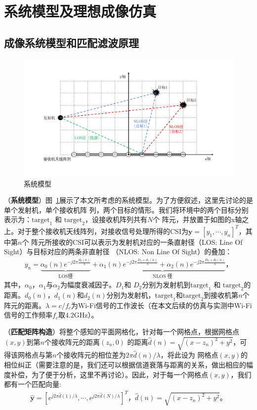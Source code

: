 \section{系统模型及理想成像仿真}
\subsection{成像系统模型和匹配滤波原理}
\begin{figure}[htb]
  \centering
  \includegraphics[width=\textwidth]{figures/system_model.pdf}
  \caption{系统模型}
  \label{系统模型}
\end{figure}
（\textbf{系统模型}）图~\ref{系统模型}展示了本文所考虑的系统模型。为了方便叙述，这里先讨论的是单个发射机，单个接收机阵
列，两个目标的情形。我们将环境中的两个目标分别表示为：$\text{target}_1$ 和 $\text{target}_2$，设接收机阵列共有$N$个
阵元，并放置于如图的x轴之上。对于整个接收机天线阵列，对接收信号处理所得的CSI为$\boldsymbol{y}=[y_1,\cdots,y_n]^T$，其中第$n$个
阵元所接收的CSI可以表示为发射机对应的一条直射径（LOS: Line Of Sight）与目标对应的两条非直射径
（NLOS: Non Line Of Sight）的叠加\cite{ma2019wifi}：
\begin{align}
  y_n = \underbrace{\alpha_0(n)e^{-j2\pi\frac{d_0(n)}{\lambda}}}_{\text{LOS径}} + \underbrace{\alpha _1(n)e^{ - j2\pi \frac{D_1 + d_1(n)}{\lambda }} + \alpha _2(n)e^{ - j2\pi \frac{D_2 + d_2(n)}{\lambda }}}_{\text{NLOS 径}}\text{，}
\end{align}
其中，$\alpha_0$，$\alpha_1$与$\alpha_2$为幅度衰减因子。$D_1$和 $D_2$分别为发射机到$\text{target}_1$ 和 $\text{target}_2$的距离。$d_0(n)$，$d_1(n)$和$d_2(n)$分别为发射机，$\text{target}_1$和$\text{target}_2$到接收机第$n$个阵元的距离。$\lambda = c/f_c$为Wi-Fi信号的工作波长（在本文后续的仿真与实测中Wi-Fi信号的工作频率$f_c$取$4.2$GHz）。


（\textbf{匹配矩阵构造}）将整个感知的平面网格化，针对每一个网格点，根据网格点$(x,y)$到第$n$个接收阵元的距离$(z_n,0)$
的距离$\hat{d}(n)=\sqrt{(x-z_n)^2+y^2}$，可得该网格点与第$n$个接收阵元的相位差为$2\pi\hat{d}(n)/\lambda$，将此设为
网格点$(x,y)$的相位纠正（需要注意的是，我们还可以根据信道衰落与距离的关系，做出相应的幅度补偿，为了便于分析，这里不再讨论）。因此，对于每一个网格点$(x,y)$，我们都有一个匹配向量:
\begin{align}
  \hat{\boldsymbol{y}}=[e^{j2\pi \hat{d}(1)/\lambda} ,\cdots,e^{j2\pi \hat{d}(N)/\lambda}]^T \text{，} \hat{d}(n)=\sqrt{(x-z_n)^2+y^2} \text{。}
  \label{matched array}
\end{align}


